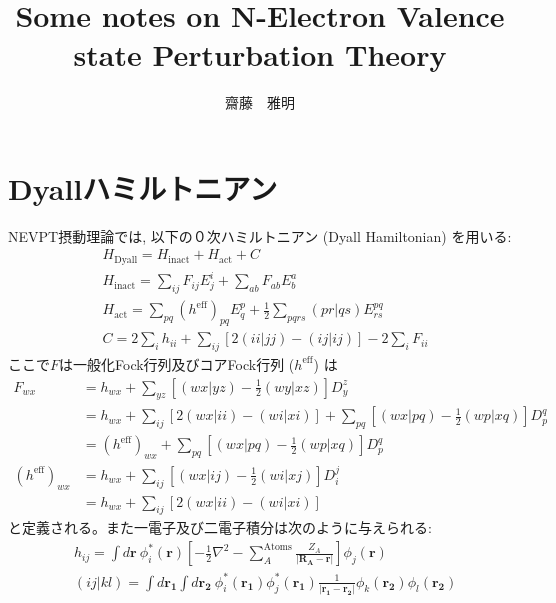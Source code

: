\documentclass[11pt,pra,aps]{revtex4}
\begin{document}
\title{Some notes on N-Electron Valence state Perturbation Theory}
\author{齋藤　雅明}

\maketitle

\section{Dyallハミルトニアン}

NEVPT摂動理論\cite{angeliintroduction2001,angelin-electron2002,angelinew2006,angelithird-order2006}では, 以下の０次ハミルトニアン (Dyall Hamiltonian) \cite{dyallthe1995}を用いる:
%
\begin{align}
  & H_\text{Dyall} = H_\text{inact} + H_\text{act} + C \label{eq:Dyall}\\
  & H_\text{inact} = \sum_{ij} F_{ij} E^i_j + \sum_{ab} F_{ab} E^a_b \\ 
  & H_\text{act}   = \sum_{pq} (h^\text{eff})_{pq}E^p_q + \frac{1}{2}\sum_{pqrs} (pr|qs) E^{pq}_{rs} \\ 
  & C = 2\sum_i h_{ii} + \sum_{ij} [2(ii|jj)-(ij|ij)] - 2\sum_i F_{ii}\label{eq:C}
\end{align}
%
ここで$F$は一般化Fock行列及びコアFock行列 ($h^\text{eff}$) は
\begin{align}
  F_{wx} &= h_{wx} + \sum_{yz} \left[ (wx|yz) - \frac{1}{2}(wy|xz)\right] D_y^z \nonumber \\
         &= h_{wx} + \sum_{ij} \left[2(wx|ii) - (wi|xi)\right] + \sum_{pq} \left[(wx|pq)-\frac{1}{2}(wp|xq)\right] D_p^q \nonumber \\
         &= (h^\text{eff})_{wx} + \sum_{pq} \left[(wx|pq)-\frac{1}{2}(wp|xq)\right] D_p^q \label{eq:genFock} \\
  (h^\text{eff})_{wx} &= h_{wx} + \sum_{ij} \left[ (wx|ij) - \frac{1}{2}(wi|xj)\right] D_i^j \nonumber \\
                      &= h_{wx} + \sum_{ij} \left[2(wx|ii) - (wi|xi)\right] \label{eq:heff}
\end{align}
と定義される。また一電子及び二電子積分は次のように与えられる:
%
\begin{align}
  & h_{ij} = \int d\mathbf{r} \ \phi^{*}_i (\mathbf{r})\left[-\frac{1}{2}\nabla^{2}-\sum_A^\text{Atoms} \frac{Z_A}{|\mathbf{R_A}-\mathbf{r}|}\right]\phi_j(\mathbf{r}) \\
  & (ij|kl) = \int d\mathbf{r_1} \int d\mathbf{r_2} \ \phi^{*}_i (\mathbf{r_1}) \phi^{*}_j (\mathbf{r_1}) \frac{1}{|\mathbf{r_1}-\mathbf{r_2}|} \phi_k(\mathbf{r_2}) \phi_l(\mathbf{r_2}) \\
\end{align}
\end{document}
